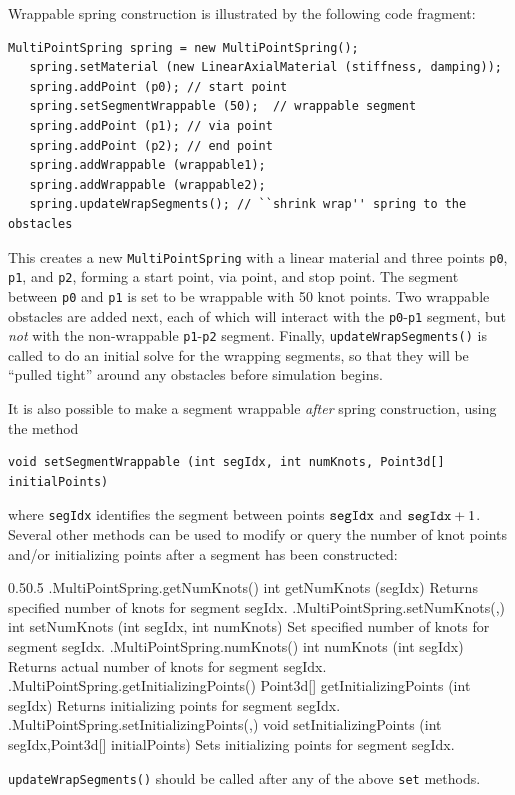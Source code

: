 Wrappable spring construction is illustrated by the following code
fragment:
%
\begin{lstlisting}[]
   MultiPointSpring spring = new MultiPointSpring();
   spring.setMaterial (new LinearAxialMaterial (stiffness, damping));
   spring.addPoint (p0); // start point
   spring.setSegmentWrappable (50);  // wrappable segment
   spring.addPoint (p1); // via point
   spring.addPoint (p2); // end point
   spring.addWrappable (wrappable1);
   spring.addWrappable (wrappable2);
   spring.updateWrapSegments(); // ``shrink wrap'' spring to the obstacles
\end{lstlisting}
%
This creates a new {\tt MultiPointSpring} with a linear material and
three points {\tt p0}, {\tt p1}, and {\tt p2}, forming a start point,
via point, and stop point.  The segment between {\tt p0} and {\tt p1}
is set to be wrappable with 50 knot points. Two wrappable obstacles
are added next, each of which will interact with the {\tt p0}-{\tt p1}
segment, but {\it not} with the non-wrappable {\tt p1}-{\tt p2}
segment. Finally, {\tt updateWrapSegments()} is called to do an
initial solve for the wrapping segments, so that they will be ``pulled
tight'' around any obstacles before simulation begins.

It is also possible to make a segment wrappable {\it after}
spring construction, using the method
%
\begin{lstlisting}[]
   void setSegmentWrappable (int segIdx, int numKnots, Point3d[] initialPoints)
\end{lstlisting}
%
where {\tt segIdx} identifies the segment between points ${\tt segIdx}$ and
${\tt segIdx}+1$. Several other methods can be used to modify or query the
number of knot points and/or initializing points after a segment has been
constructed:
%
\begin{methodtable}{0.5}{0.5}
\midline
%
\methodentry
{\mech.MultiPointSpring.getNumKnots()}%
{int getNumKnots (segIdx)}%
{Returns specified number of knots for segment segIdx.}%
%
\methodentry
{\mech.MultiPointSpring.setNumKnots(,)}%
{int setNumKnots (int segIdx, int numKnots)}%
{Set specified number of knots for segment segIdx.}%
%
\methodentry
{\mech.MultiPointSpring.numKnots()}%
{int numKnots (int segIdx)}%
{Returns actual number of knots for segment segIdx.}%
%
\methodspace{0.5em}%
\methodentry
{\mech.MultiPointSpring.getInitializingPoints()}%
{Point3d[] getInitializingPoints (int segIdx)}%
{Returns initializing points for segment segIdx.}%
%
\methodentry
{\mech.MultiPointSpring.setInitializingPoints(,)}%
{void setInitializingPoints (int segIdx,\brh Point3d[] initialPoints)}%
{Sets initializing points for segment segIdx.}%
%
\midline
\end{methodtable}
%
{\tt updateWrapSegments()} should be called after any of the above {\tt set}
methods.

